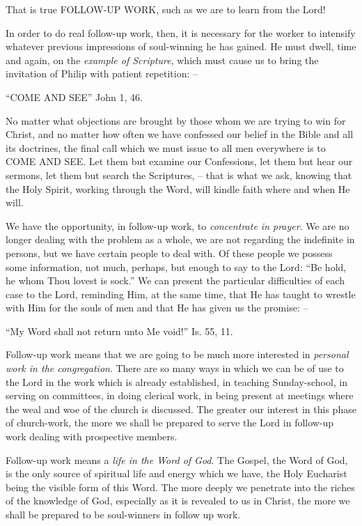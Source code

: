 \documentclass[
]{book}
\begin{document}
That is true FOLLOW-UP WORK, such as we are to learn from the Lord!

In order to do real follow-up work, then, it is necessary for the worker to intensify whatever previous impressions of soul-winning he has gained. He must dwell, time and again, on the \emph{example of Scripture}, which must cause us to bring the invitation of Philip with patient repetition: --

``COME AND SEE'' John 1, 46.

No matter what objections are brought by those whom we are trying to win for Christ, and no matter how often we have confessed our belief in the Bible and all its doctrines, the final call which we must issue to all men everywhere is to COME AND SEE. Let them but examine our Confessions, let them but hear our sermons, let them but search the Scriptures, -- that is what we ask, knowing that the Holy Spirit, working through the Word, will kindle faith where and when He will.

We have the opportunity, in follow-up work, to \emph{concentrate in prayer}. We are no longer dealing with the problem as a whole, we are not regarding the indefinite in persons, but we have certain people to deal with. Of these people we possess some information, not much, perhaps, but enough to say to the Lord: ``Be hold, he whom Thou lovest is sock.'' We can present the particular difficulties of each case to the Lord, reminding Him, at the same time, that He has taught to wrestle with Him for the souls of men and that He has given us the promise: --

``My Word shall not return unto Me void!'' Is. 55, 11.

Follow-up work means that we are going to be much more interested in \emph{personal work in the congregation}. There are so many ways in which we can be of use to the Lord in the work which is already established, in teaching Sunday-school, in serving on committees, in doing clerical work, in being present at meetings where the weal and woe of the church is discussed. The greater our interest in this phase of church-work, the more we shall be prepared to serve the Lord in follow-up work dealing with prospective members.

Follow-up work means a \emph{life in the Word of God}. The Gospel, the Word of God, is the only source of spiritual life and energy which we have, the Holy Eucharist being the visible form of this Word. The more deeply we penetrate into the riches of the knowledge of God, especially as it is revealed to us in Christ, the more we shall be prepared to be soul-winners in follow up work.
\end{document}

